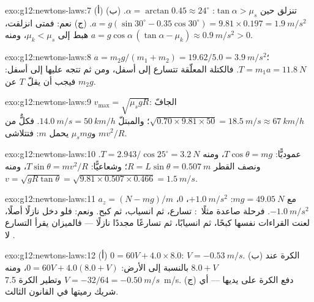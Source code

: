 \begin{solution}{exo:g12:newtons-laws:7}
(أ) تنزلق حين $\tan\alpha > \mu_s$: $\alpha = \arctan 0.45 \approx
24^\circ$. (ب) $a = g(\sin 30^\circ - 0.35\cos 30^\circ) =
9.81 \times 0.197 = \qty{1.9}{m/s^2}$. (ج) نعم: فمتى انزلقت،
هبط  إلى $\mu_k < \mu_s$، ومنه
$a = g\cos\alpha\,(\tan\alpha - \mu_k) \approx \qty{0.9}{m/s^2} > 0$.
\end{solution}

\begin{solution}{exo:g12:newtons-laws:8}
$a = m_2 g/(m_1 + m_2) = 19.62/5.0 = \qty{3.9}{m/s^2}$؛
$T = m_1 a = \qty{11.8}{N}$. فالكتلة المعلّقة تتسارع إلى أسفل،
ومن ثم تتجه  عليها إلى أسفل: فيجب أن يقلّ $T$ عن $m_2 g$.
\end{solution}

\begin{solution}{exo:g12:newtons-laws:9}
$v_{\max} = \sqrt{\mu_s g R}$: الجافّ
$\sqrt{0.70 \times 9.81 \times 50} = \qty{18.5}{m/s} \approx
\qty{67}{km/h}$؛ والمبتلّ $\qty{14.0}{m/s} = \qty{50}{km/h}$. فكلٌّ من
$mv^2/R$ و$\mu_s mg$ يحمل $m$: فتتلاشى.
\end{solution}

\begin{solution}{exo:g12:newtons-laws:10}
عموديًّا: $T\cos\theta = mg$، ومنه
$T = 2.943/\cos 25^\circ = \qty{3.2}{N}$. ونصف القطر $R = L\sin\theta =
\qty{0.507}{m}$؛ وشعاعيًّا: $T\sin\theta = mv^2/R$، ومنه
$v = \sqrt{gR\tan\theta} = \sqrt{9.81 \times 0.507 \times 0.466}
= \qty{1.5}{m/s}$.
\end{solution}

\begin{solution}{exo:g12:newtons-laws:11}
$a_z = (N - mg)/m$ مع $mg = \qty{49.05}{N}$: $+\qty{1.0}{m/s^2}$،
$0$، $-\qty{1.0}{m/s^2}$. فرحلة صاعدة مثلًا\ : تسارع، ثم انسياب، ثم
كبح. ونعم: فلو دخل نازلًا أصلًا، لعنت القراءات نفسها كبحًا، ثم
انسيابًا، ثم تسارعًا مجددًا نازلًا --- فالميزان يقرأ التسارع لا
.
\end{solution}

\begin{solution}{exo:g12:newtons-laws:12}
(أ) $0 = 60V + 4.0 \times 8.0$: $V = \qty{-0.53}{m/s}$.
(ب) الكرة عند $8.0 + V$ بالنسبة إلى الأرض: $0 = 60V + 4.0(8.0 + V)$، ومنه
$V = -32/64 = \qty{-0.50}{m/s}$ وتطير الكرة  \qty{7.5}{m/s}.
(ج) دفع الكرة على يديها --- أي شريك رميتها في القانون
الثالث.
\end{solution}

